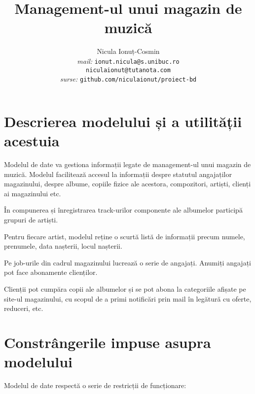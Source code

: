 \documentclass[a4paper, oneside, 12pt]{article}
\title{Management-ul unui magazin de muzică}
\author{Nicula Ionuț-Cosmin \\ \emph{mail: }\texttt{ionut.nicula@s.unibuc.ro}
        \\\hspace{35pt}\texttt{niculaionut@tutanota.com}
\\ \emph{surse: }\texttt{github.com/niculaionut/proiect-bd}}
\begin{document}
\maketitle

\newpage

\tableofcontents

\newpage

\section{Descrierea modelului și a utilității acestuia}

Modelul de date va gestiona informații legate de management-ul unui magazin de
muzică. Modelul facilitează accesul la informații despre statutul angajaților
magazinului, despre albume, copiile fizice ale acestora, compozitori, artiști,
clienți ai magazinului etc.

În compunerea și înregistrarea track-urilor componente ale albumelor participă grupuri de artiști.

Pentru fiecare artist, modelul reține o scurtă listă de informații precum numele, prenumele, data
nașterii, locul nașterii.

Pe job-urile din cadrul magazinului lucrează o serie de angajați. Anumiți
angajați pot face abonamente clienților.

Clienții pot cumpăra copii ale albumelor și se pot abona la categoriile afișate
pe site-ul magazinului, cu scopul de a primi notificări prin mail în legătură
cu oferte, reduceri, etc.

\section{Constrângerile impuse asupra modelului}

Modelul de date respectă o serie de restricții de funcționare:
\end{document}
